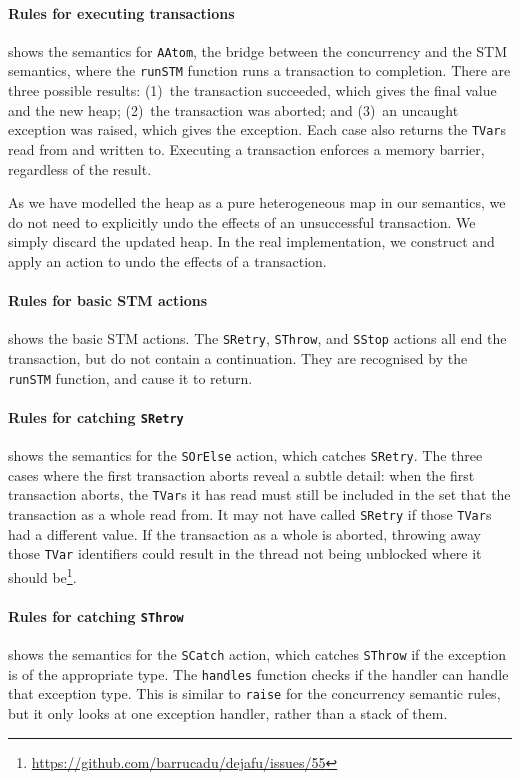 \paragraph{Rules for executing transactions}
 shows the semantics for \verb|AAtom|, the bridge
between the concurrency and the STM semantics, where the \verb|runSTM|
function runs a transaction to completion.  There are three possible
results: (1)~the transaction succeeded, which gives the final value
and the new heap; (2)~the transaction was aborted; and (3)~an uncaught
exception was raised, which gives the exception.  Each case also
returns the \verb|TVar|s read from and written to.  Executing a
transaction enforces a memory barrier, regardless of the result.

As we have modelled the heap as a pure heterogeneous map in our
semantics, we do not need to explicitly undo the effects of an
unsuccessful transaction.  We simply discard the updated heap.  In the
real implementation, we construct and apply an action to undo the
effects of a transaction.

\paragraph{Rules for basic STM actions}
 shows the basic STM actions.  The \verb|SRetry|,
\verb|SThrow|, and \verb|SStop| actions all end the transaction, but
do not contain a continuation.  They are recognised by the
\verb|runSTM| function, and cause it to return.

\paragraph{Rules for catching \texttt{SRetry}}
 shows the semantics for the \verb|SOrElse| action,
which catches \verb|SRetry|.  The three cases where the first
transaction aborts reveal a subtle detail: when the first transaction
aborts, the \verb|TVar|s it has read must still be included in the set
that the transaction as a whole read from.  It may not have called
\verb|SRetry| if those \verb|TVar|s had a different value.  If the
transaction as a whole is aborted, throwing away those \verb|TVar|
identifiers could result in the thread not being unblocked where it
should
be\footnote{\url{https://github.com/barrucadu/dejafu/issues/55}}.

\paragraph{Rules for catching \texttt{SThrow}}
 shows the semantics for the \verb|SCatch| action,
which catches \verb|SThrow| if the exception is of the appropriate
type.  The \verb|handles| function checks if the handler can handle
that exception type.  This is similar to \verb|raise| for the
concurrency semantic rules, but it only looks at one exception
handler, rather than a stack of them.

